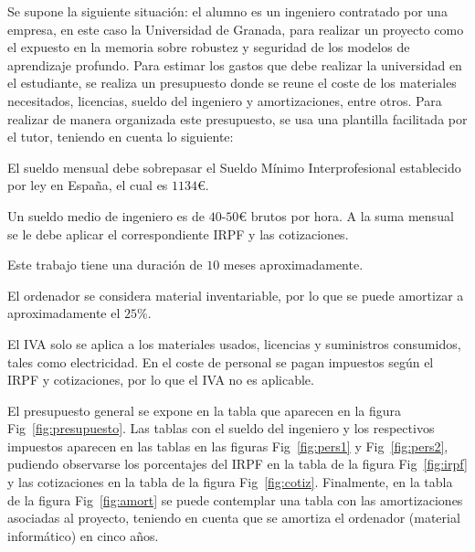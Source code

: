 Se supone la siguiente situación: el alumno es un ingeniero contratado por una empresa, en este caso la Universidad de Granada, para realizar un proyecto como el expuesto en la memoria sobre robustez y seguridad de los modelos de aprendizaje profundo. Para estimar los gastos que debe realizar la universidad en el estudiante, se realiza un presupuesto donde se reune el coste de los materiales necesitados, licencias, sueldo del ingeniero y amortizaciones, entre otros. Para realizar de manera organizada este presupuesto, se usa una plantilla facilitada por el tutor, teniendo en cuenta lo siguiente:

\begin{item}
    \item El sueldo mensual debe sobrepasar el Sueldo Mínimo Interprofesional establecido por ley en España, el cual es $1134€$.

    \item Un sueldo medio de ingeniero es de $40$-$50 €$ brutos por hora. A la suma mensual se le debe aplicar el correspondiente IRPF y las cotizaciones.

    \item Este trabajo tiene una duración de $10$ meses aproximadamente.

    \item El ordenador se considera material inventariable, por lo que se puede amortizar a aproximadamente el $25 \%$.

    \item El IVA solo se aplica a los materiales usados, licencias y suministros consumidos, tales como electricidad. En el coste de personal se pagan impuestos según el IRPF y cotizaciones, por lo que el IVA no es aplicable.
\end{item}

El presupuesto general se expone en la tabla que aparecen en la figura Fig~\ref{fig:presupuesto}. Las tablas con el sueldo del ingeniero y los respectivos impuestos aparecen en las tablas en las figuras Fig~\ref{fig:pers1} y Fig~\ref{fig:pers2}, pudiendo observarse los porcentajes del IRPF en la tabla de la figura Fig~\ref{fig:irpf} y las cotizaciones en la tabla de la figura Fig~\ref{fig:cotiz}. Finalmente, en la tabla de la figura Fig~\ref{fig:amort} se puede contemplar una tabla con las amortizaciones asociadas al proyecto, teniendo en cuenta que se amortiza el ordenador (material informático) en cinco años.

